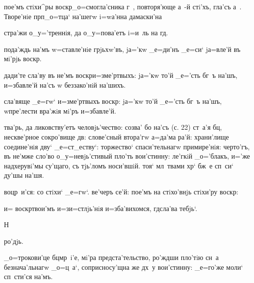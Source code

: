 
пое'мъ стiхи^ры воскр _о=смогла'сника г~, повторя'юще 
а~-й стi'хъ, гла'съ а~. Творе'нiе прп _о=тца` 
на'шегw i=wа'нна дамаски'на%

стра'жи о_у='треннiя, да о_у=пова'етъ i=и~ль на гд.

пода'ждь на'мъ w=ставле'нiе грjьхw'въ, jа='кw _е=ди'нъ 
_е=си` jа=вле'й въ мi'рjь воскр.

дади'те сла'ву въ не'мъ воскр и=з\ъ ме'ртвыхъ: 
jа='кw то'й _е='сть бг~ъ на'шъ, и=збавле'й на'съ w\т 
беззако'нiй на'шихъ.

сла'вяще _е=гw` и=з\ъ ме'ртвыхъ воскр: jа='кw то'й 
_е='сть бг~ъ на'шъ, w\т пре'лести вра'жiя мi'ръ 
и=збавле'й.


тва'рь, да ликовству'етъ человjь'чество: созва' бо на'съ 
(с. 22) ст~а'я бц, нескве'рное сокро'вище дв: 
слове'сный втора'гw а=да'ма ра'й: храни'лище соедине'нiя 
дву` _е=ст_еству`: торжество` спаси'тельнагw примире'нiя: 
черто'гъ, въ не'мже сло'во о_у=невjь'стивый пло'ть 
вои'стинну: ле'гкiй _о='блакъ, и='же над\ъ херувi'мы 
су'щаго, съ тjь'ломъ носи'вшiй. тоя` мл~твами хр` 
бж~е сп~си` ду'шы на'шя.

воцр~и'ся: со стiхи` _е=гw`. %
ве'черъ се'й: %
пое'мъ на стiхо'внjь стiхи'ру воскр:%

и= воскр твои'мъ и=з\ъ и=стлjь'нiя и=зба'вихомся, 
гд сла'ва тебjь`.

Н%

ро'дjь.

_о=трокови'це бц мр~i'е, мi'ра предста'тельство, 
ро'ждши пло'тiю сн~а безнача'льнагw _о=ц~а`, 
соприсносу'щна же дх~у вои'стинну: _е=го'же моли` 
сп~сти'ся на'мъ.

